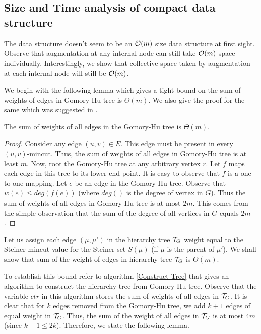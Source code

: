 \subsection{Size and Time analysis of compact data structure}
\label{appendix:size-time-analysis-compact-ds}

The data structure doesn't seem to be an ${\cal O}(m)$ size data structure at first sight. Observe that augmentation at any internal node can still take ${\cal O}(m)$ space individually. Interestingly, we show that collective space taken by augmentation at each internal node will still be ${\cal O}(m)$.

We begin with the following lemma which gives a tight bound on the sum of weights of edges in Gomory-Hu tree is $\Theta(m)$. We also give the proof for the same which was suggested in \cite{DBLP:conf/stoc/HariharanKPB07,DBLP:journals/siamcomp/DinitzV00}.

\begin{lemma}
\label{fact:GH-weight}
The sum of weights of all edges in the Gomory-Hu tree is ${\Theta}(m)$.
\end{lemma}
\begin{proof}
Consider any edge $(u,v)\in E$. This edge must be present in every $(u,v)$-mincut. Thus, the sum of weights of all edges in Gomory-Hu tree is at least $m$. Now, root the Gomory-Hu tree at any arbitrary vertex $r$. Let $f$ maps each edge in this tree to its lower end-point. It is easy to observe that $f$ is a one-to-one mapping. Let $e$ be an edge in the Gomory-Hu tree. Observe that $w(e) \leq deg(f(e))$ (where $deg()$ is the degree of vertex in $G$). Thus the sum of weights of all edges in Gomory-Hu tree is at most $2m$. This comes from the simple observation that the sum of the degree of all vertices in $G$ equals $2m$.
\end{proof}

Let us assign each edge $(\mu,\mu')$ in the hierarchy tree ${\cal T}_G$ weight equal to the Steiner mincut value for the Steiner set $S(\mu)$ (if $\mu$ is the parent of $\mu'$). We shall show that sum of the weight of edges in hierarchy tree ${\cal T}_G$ is $\Theta(m)$. %

To establish this bound refer to algorithm \ref{Construct Tree} that gives an algorithm to construct the hierarchy tree from Gomory-Hu tree. Observe that the variable $ctr$ in this algorithm stores the sum of weights of all edges in ${\cal T}_G$. It is clear that for $k$ edges removed from the Gomory-Hu tree, we add $k+1$ edges of equal weight in ${\cal T}_G$. Thus, the sum of the weight of all edges in ${\cal T}_G$ is at most $4m$ (since $k+1 \leq 2k$). Therefore, we state the following lemma.

